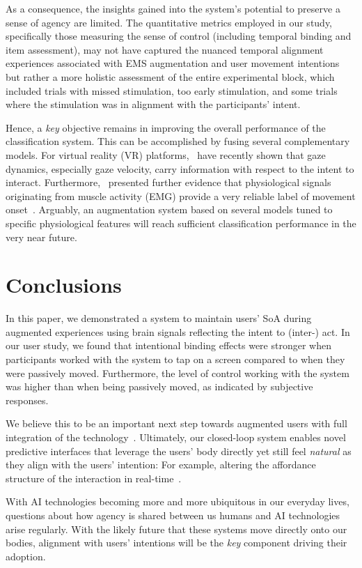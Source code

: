 As a consequence, the insights gained into the system's potential to preserve a sense of agency are limited. The quantitative metrics employed in our study, specifically those measuring the sense of control (including temporal binding and item assessment), may not have captured the nuanced temporal alignment experiences associated with EMS augmentation and user movement intentions but rather a more holistic assessment of the entire experimental block, which included trials with missed stimulation, too early stimulation, and some trials where the stimulation was in alignment with the participants' intent.

Hence, a \textit{key} objective remains in improving the overall performance of the classification system. This can be accomplished by fusing several complementary models. For virtual reality (VR) platforms,~\citet{David-John2021-vg} have recently shown that gaze dynamics, especially gaze velocity, carry information with respect to the intent to interact. Furthermore,~\citet{Nguyen2023-me} presented further evidence that physiological signals originating from muscle activity (EMG) provide a very reliable label of movement onset~\cite{Nguyen2023-me}. Arguably, an augmentation system based on several models tuned to specific physiological features will reach sufficient classification performance in the very near future.

\section{Conclusions}
In this paper, we demonstrated a system to maintain users' SoA during augmented experiences using brain signals reflecting the intent to (inter-) act. In our user study, we found that intentional binding effects were stronger when participants worked with the system to tap on a screen compared to when they were passively moved. Furthermore, the level of control working with the system was higher than when being passively moved, as indicated by subjective responses.

We believe this to be an important next step towards augmented users with full integration of the technology~\cite{Mueller2020-dl}. Ultimately, our closed-loop system enables novel predictive interfaces that leverage the users' body directly yet still feel \textit{natural} as they align with the users' intention: For example, altering the affordance structure of the interaction in real-time~\cite{Gehrke2022-kz, Lopes2015-ze, Nataraj2020-wm}.

With AI technologies becoming more and more ubiquitous in our everyday lives, questions about how agency is shared between us humans and AI technologies arise regularly. With the likely future that these systems move directly onto our bodies, alignment with users' intentions will be the \textit{key} component driving their adoption.

